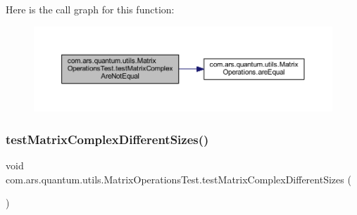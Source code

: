 Here is the call graph for this function\+:\nopagebreak
\begin{figure}[H]
\begin{center}
\leavevmode
\includegraphics[width=350pt]{classcom_1_1ars_1_1quantum_1_1utils_1_1_matrix_operations_test_a510001ff5f110f317a003aad024b7814_cgraph}
\end{center}
\end{figure}
\hypertarget{classcom_1_1ars_1_1quantum_1_1utils_1_1_matrix_operations_test_a2067fc7495133c6604494ae61c0b21f5}{}\label{classcom_1_1ars_1_1quantum_1_1utils_1_1_matrix_operations_test_a2067fc7495133c6604494ae61c0b21f5} 
\subsubsection{\texorpdfstring{test\+Matrix\+Complex\+Different\+Sizes()}{testMatrixComplexDifferentSizes()}}
{\footnotesize\ttfamily void com.\+ars.\+quantum.\+utils.\+Matrix\+Operations\+Test.\+test\+Matrix\+Complex\+Different\+Sizes (\begin{DoxyParamCaption}{ }\end{DoxyParamCaption})}

